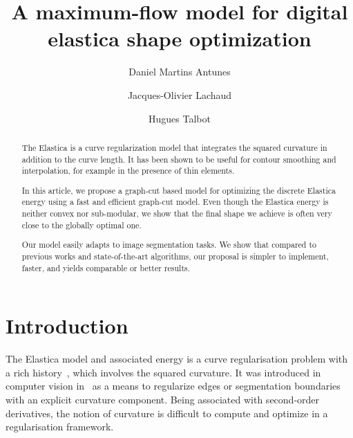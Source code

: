 \documentclass[runningheads]{llncs}
\begin{document}
%
\title{A maximum-flow model for digital elastica shape optimization}
%
%
\author{Daniel Martins Antunes \and
Jacques-Olivier Lachaud \and
Hugues Talbot}
%
%
%
\maketitle              %
%
\begin{abstract}
  The Elastica is a curve regularization model that integrates the squared curvature in addition to the curve length. It
  has been shown to be useful for contour smoothing and interpolation, for example in the presence of thin
  elements.

  In this article, we propose a graph-cut based model for optimizing the discrete Elastica energy using a fast and
  efficient graph-cut model.  Even though the Elastica energy is neither convex nor sub-modular, we show that the final
  shape we achieve is often very close to the globally optimal one.

  Our model easily adapts to image segmentation tasks. We show that compared to previous works and state-of-the-art
  algorithms, our proposal is simpler to implement, faster, and yields comparable or better results.

\end{abstract}
%
%
%
\section{Introduction}

The Elastica model and associated energy is a curve regularisation problem with a rich
history~\cite{matsutani2010euler,levien08elastica}, which involves the squared curvature.  It was introduced in computer
vision in~\cite{mumford94elastica} as a means to regularize edges or segmentation boundaries with an explicit curvature
component. Being associated with second-order derivatives, the notion of curvature is difficult to compute and optimize
in a regularisation framework.
\end{document}
